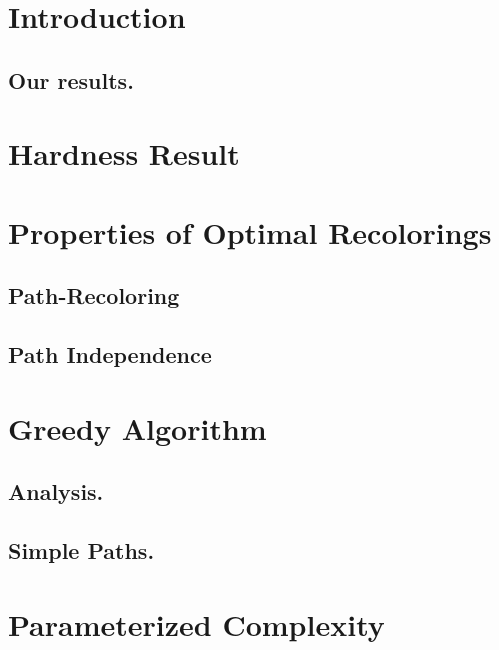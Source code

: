 

\section{Introduction}

	
\subsection*{\bf Our results.}


\section{Hardness Result}



\section{Properties of Optimal Recolorings}

	
	\subsection{Path-Recoloring}
	
	
	\subsection{Path Independence}
	


\section{Greedy Algorithm}




\subsection*{\bf Analysis.}


\subsection*{\bf Simple Paths.}


\section{Parameterized Complexity}
